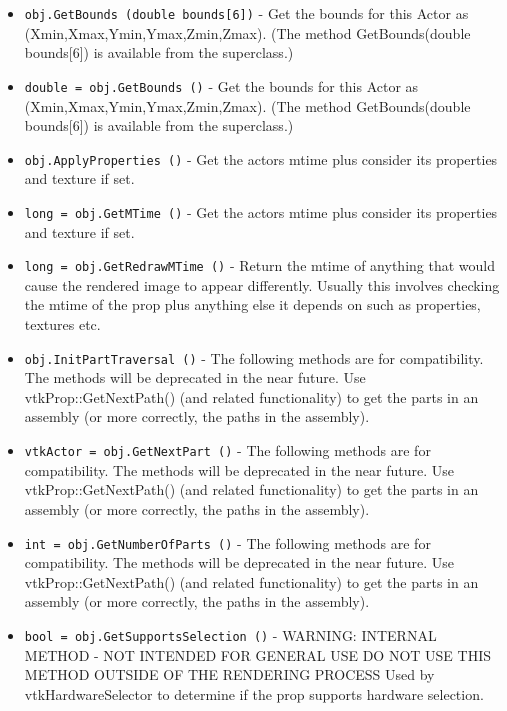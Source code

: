 \begin{itemize}
\item  \verb|obj.GetBounds (double bounds[6])| -  Get the bounds for this Actor as (Xmin,Xmax,Ymin,Ymax,Zmin,Zmax). (The
 method GetBounds(double bounds[6]) is available from the superclass.)

\item  \verb|double = obj.GetBounds ()| -  Get the bounds for this Actor as (Xmin,Xmax,Ymin,Ymax,Zmin,Zmax). (The
 method GetBounds(double bounds[6]) is available from the superclass.)

\item  \verb|obj.ApplyProperties ()| -  Get the actors mtime plus consider its properties and texture if set.

\item  \verb|long = obj.GetMTime ()| -  Get the actors mtime plus consider its properties and texture if set.

\item  \verb|long = obj.GetRedrawMTime ()| -  Return the mtime of anything that would cause the rendered image to 
 appear differently. Usually this involves checking the mtime of the 
 prop plus anything else it depends on such as properties, textures
 etc.

\item  \verb|obj.InitPartTraversal ()| -  The following methods are for compatibility. The methods will be deprecated
 in the near future. Use vtkProp::GetNextPath() (and related functionality)
 to get the parts in an assembly (or more correctly, the paths in the
 assembly).

\item  \verb|vtkActor = obj.GetNextPart ()| -  The following methods are for compatibility. The methods will be deprecated
 in the near future. Use vtkProp::GetNextPath() (and related functionality)
 to get the parts in an assembly (or more correctly, the paths in the
 assembly).

\item  \verb|int = obj.GetNumberOfParts ()| -  The following methods are for compatibility. The methods will be deprecated
 in the near future. Use vtkProp::GetNextPath() (and related functionality)
 to get the parts in an assembly (or more correctly, the paths in the
 assembly).

\item  \verb|bool = obj.GetSupportsSelection ()| -  WARNING: INTERNAL METHOD - NOT INTENDED FOR GENERAL USE
 DO NOT USE THIS METHOD OUTSIDE OF THE RENDERING PROCESS
 Used by vtkHardwareSelector to determine if the prop supports hardware
 selection.

\end{itemize}
